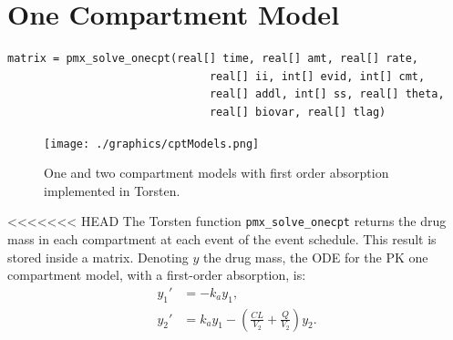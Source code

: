 \documentclass[11pt, reqno, oneside]{amsbook}
\numberwithin{equation}{chapter}
\numberwithin{figure}{chapter}
\numberwithin{table}{chapter}
\theoremstyle{remark}
\begin{document}

\section{One Compartment Model}
\label{sec:org9effe94}
\label{org1212574}
\begin{verbatim}
matrix = pmx_solve_onecpt(real[] time, real[] amt, real[] rate,
                               real[] ii, int[] evid, int[] cmt,
                               real[] addl, int[] ss, real[] theta,
                               real[] biovar, real[] tlag)
\end{verbatim}

\begin{figure}[htbp]
\centering
\texttt{[image: ./graphics/cptModels.png]}
\caption{\label{fig:orgb40aec5}
One and two compartment models with first order absorption implemented in Torsten.}
\end{figure}

<<<<<<< HEAD
The Torsten function \texttt{pmx\_solve\_onecpt} returns the drug mass in each compartment
at each event of the event schedule.
This result is stored inside a matrix.
Denoting $y$ the drug mass, the ODE for the PK one compartment model, with a first-order
absorption, is:
%
\begin{subequations}
\begin{align}
  y_1' &= -k_a y_1, \\
  y_2' &= k_a y_1 - \left(\frac{CL}{V_2} + \frac{Q}{V_2}\right) y_2.
\end{align}
\label{eq:onecpt}
\end{subequations}
\end{document}
